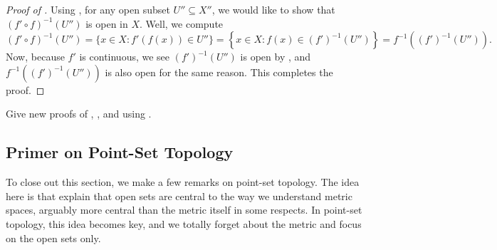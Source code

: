\documentclass[../main.tex]{subfiles}
\begin{document}
\begin{proof}[Proof of ]
    Using , for any open subset $U''\subseteq X''$, we would like to show that $(f'\circ f)^{-1}(U'')$ is open in $X$. Well, we compute
    \[(f'\circ f)^{-1}(U'')=\{x\in X:f'(f(x))\in U''\}=\left\{x\in X:f(x)\in(f')^{-1}(U'')\right\}=f^{-1}\left((f')^{-1}(U'')\right).\]
    Now, because $f'$ is continuous, we see $(f')^{-1}(U'')$ is open by , and $f^{-1}\left((f')^{-1}(U'')\right)$ is also open for the same reason. This completes the proof.
\end{proof}
\begin{exercise}
    Give new proofs of , , and  using .
\end{exercise}

\subsection{Primer on Point-Set Topology}
To close out this section, we make a few remarks on point-set topology. The idea here is that  explain that open sets are central to the way we understand metric spaces, arguably more central than the metric itself in some respects. In point-set topology, this idea becomes key, and we totally forget about the metric and focus on the open sets only.
\end{document}
